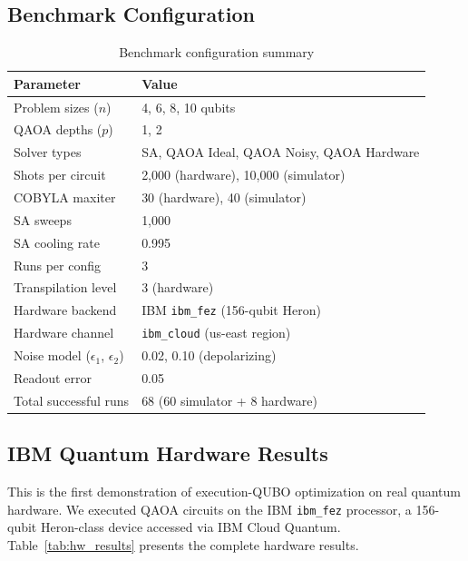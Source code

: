 \documentclass[11pt]{article}
\begin{document}
\subsection{Benchmark Configuration}

\begin{table}[t]
\centering
\caption{Benchmark configuration summary}
\label{tab:config}
\begin{tabular}{@{}ll@{}}
\toprule
\textbf{Parameter} & \textbf{Value} \\
\midrule
Problem sizes ($n$) & 4, 6, 8, 10 qubits \\
QAOA depths ($p$) & 1, 2 \\
Solver types & SA, QAOA Ideal, QAOA Noisy, QAOA Hardware \\
Shots per circuit & 2,000 (hardware), 10,000 (simulator) \\
COBYLA maxiter & 30 (hardware), 40 (simulator) \\
SA sweeps & 1,000 \\
SA cooling rate & 0.995 \\
Runs per config & 3 \\
Transpilation level & 3 (hardware) \\
\midrule
Hardware backend & IBM \texttt{ibm\_fez} (156-qubit Heron) \\
Hardware channel & \texttt{ibm\_cloud} (us-east region) \\
Noise model ($\epsilon_1$, $\epsilon_2$) & 0.02, 0.10 (depolarizing) \\
Readout error & 0.05 \\
\midrule
Total successful runs & 68 (60 simulator + 8 hardware) \\
\bottomrule
\end{tabular}
\end{table}

\subsection{IBM Quantum Hardware Results}

This is the first demonstration of execution-QUBO optimization on real quantum hardware. We executed QAOA circuits on the IBM \texttt{ibm\_fez} processor, a 156-qubit Heron-class device accessed via IBM Cloud Quantum. Table~\ref{tab:hw_results} presents the complete hardware results.
\end{document}
